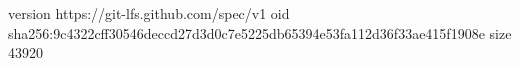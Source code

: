 version https://git-lfs.github.com/spec/v1
oid sha256:9c4322cff30546deccd27d3d0c7e5225db65394e53fa112d36f33ae415f1908e
size 43920
